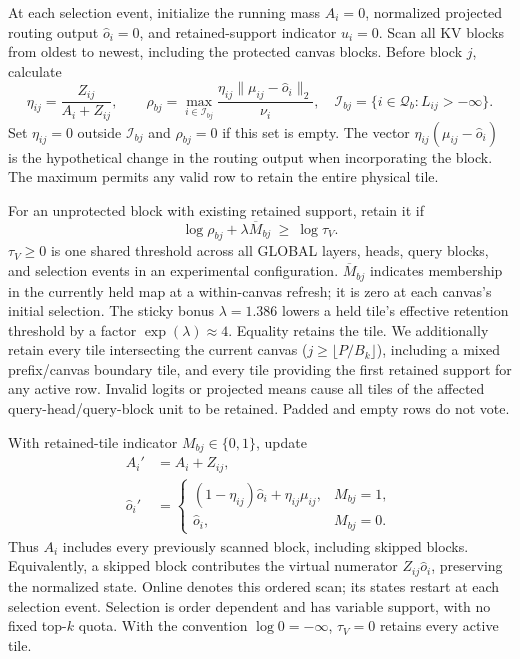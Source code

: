 \documentclass[10pt]{article}
\begin{document}
At each selection event, initialize the running mass $A_i=0$, normalized
projected routing output $\widehat o_i=0$, and retained-support indicator
$u_i=0$. Scan all KV blocks from oldest to newest, including the protected
canvas blocks. Before block $j$, calculate
\begin{equation}
 \eta_{ij}=\frac{Z_{ij}}{A_i+Z_{ij}},
 \qquad
 \rho_{bj}=\max_{i\in\mathcal I_{bj}}
 \frac{\eta_{ij}\|\mu_{ij}-\widehat o_i\|_2}{\nu_i},
 \quad
 \mathcal I_{bj}=\{i\in\mathcal Q_b:L_{ij}>-\infty\}.
 \label{eq:v2-risk}
\end{equation}
Set $\eta_{ij}=0$ outside $\mathcal I_{bj}$ and $\rho_{bj}=0$ if this set
is empty. The vector $\eta_{ij}(\mu_{ij}-\widehat o_i)$ is the hypothetical
change in the routing output when incorporating the block. The maximum
permits any valid row to retain the entire physical tile.

For an unprotected block with existing retained support, retain it if
\begin{equation}
 \log\rho_{bj}+\lambda\overline M_{bj}\ \ge\ \log\tau_V.
 \label{eq:v2-threshold}
\end{equation}
$\tau_V\ge0$ is one shared threshold across all GLOBAL layers, heads,
query blocks, and selection events in an experimental configuration.
$\overline M_{bj}$ indicates membership in the currently held map at a
within-canvas refresh; it is zero at each canvas's initial selection.
The sticky bonus $\lambda=1.386$ lowers a held tile's effective retention
threshold by a factor $\exp(\lambda)\approx4$. Equality retains the tile.
We additionally retain every tile intersecting the current canvas
($j\ge\lfloor P/B_k\rfloor$), including a mixed prefix/canvas boundary
tile, and every tile providing the first retained support for any active
row. Invalid logits or projected means cause all tiles of the affected
query-head/query-block unit to be retained. Padded and empty rows do not vote.

With retained-tile indicator $M_{bj}\in\{0,1\}$, update
\begin{align}
 A_i'&=A_i+Z_{ij}, \label{eq:v2-mass-update}\\
 \widehat o_i'&=
 \begin{cases}
  (1-\eta_{ij})\widehat o_i+\eta_{ij}\mu_{ij}, & M_{bj}=1,\\
  \widehat o_i, & M_{bj}=0.
 \end{cases}
 \label{eq:v2-output-update}
\end{align}
Thus $A_i$ includes every previously scanned block, including skipped
blocks. Equivalently, a skipped block contributes the virtual numerator
$Z_{ij}\widehat o_i$, preserving the normalized state. Online denotes this
ordered scan; its states restart at each selection event. Selection is
order dependent and has variable support, with no fixed top-$k$ quota.
With the convention $\log0=-\infty$, $\tau_V=0$ retains every active tile.
\end{document}
